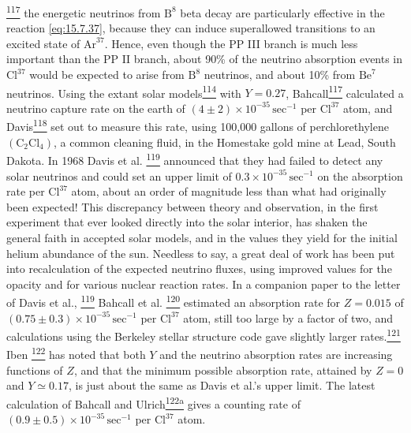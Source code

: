\hyperref[ch15-ref-117]{\textsuperscript{117}} the energetic neutrinos from
\(\mathrm B^8\) beta decay are particularly effective in the reaction
\eqref{eq:15.7.37}, because they can induce superallowed transitions to an
excited state of \(\mathrm{Ar}^{37}\). Hence, even though the PP III branch
is much less important than the PP II branch, about 90\% of the neutrino
absorption events in \(\mathrm{Cl}^{37}\) would be expected to arise from
\(\mathrm B^8\) neutrinos, and about 10\% from \(\mathrm{Be}^7\) neutrinos.
Using the extant solar models\hyperref[ch15-ref-114]{\textsuperscript{114}}
with \(Y=0.27\), Bahcall\hyperref[ch15-ref-117]{\textsuperscript{117}}
calculated a neutrino capture rate on the earth of
\((4\pm2)\times10^{-35}\,\mathrm{sec}^{-1}\) per \(\mathrm{Cl}^{37}\) atom,
and Davis\hyperref[ch15-ref-118]{\textsuperscript{118}} set out to measure
this rate, using 100,000 gallons of perchlorethylene
\((\mathrm C_2\mathrm{Cl}_4)\), a common cleaning fluid, in the Homestake
gold mine at Lead, South Dakota. In 1968 Davis et al.%
\hyperref[ch15-ref-119]{\textsuperscript{119}} announced that they had
failed to detect any solar neutrinos and could set an upper limit of
\(0.3\times10^{-35}\,\mathrm{sec}^{-1}\) on the absorption rate per
\(\mathrm{Cl}^{37}\) atom, about an order of magnitude less than what had
originally been expected! This discrepancy between theory and observation,
in the first experiment that ever looked directly into the solar interior,
has shaken the general faith in accepted solar models, and in the values they
yield for the initial helium abundance of the sun. Needless to say, a great
deal of work has been put into recalculation of the expected neutrino fluxes,
using improved values for the opacity and for various nuclear reaction rates.
In a companion paper to the letter of Davis et al.,%
\hyperref[ch15-ref-119]{\textsuperscript{119}} Bahcall et al.%
\hyperref[ch15-ref-120]{\textsuperscript{120}} estimated an absorption rate
for \(Z=0.015\) of
\((0.75\pm0.3)\times10^{-35}\,\mathrm{sec}^{-1}\) per
\(\mathrm{Cl}^{37}\) atom, still too large by a factor of two, and
calculations using the Berkeley stellar structure code gave slightly larger
rates.\hyperref[ch15-ref-121]{\textsuperscript{121}} Iben%
\hyperref[ch15-ref-122]{\textsuperscript{122}} has noted that both \(Y\) and
the neutrino absorption rates are increasing functions of \(Z\), and that the
minimum possible absorption rate, attained by \(Z=0\) and \(Y\simeq0.17\),
is just about the same as Davis et al.'s upper limit. The latest calculation
of Bahcall and Ulrich\hyperref[ch15-ref-122a]{\textsuperscript{122a}} gives
a counting rate of
\((0.9\pm0.5)\times10^{-35}\,\mathrm{sec}^{-1}\) per
\(\mathrm{Cl}^{37}\) atom.

